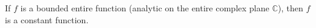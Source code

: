 If $f$ is a bounded entire function (analytic on the entire complex plane $\mathbb{C}$), then $f$ is a constant function.
